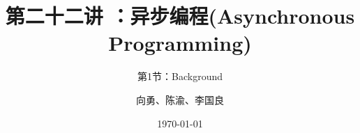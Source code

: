 


\title[第22讲]{第二十二讲 ：异步编程(Asynchronous Programming)} %
\subtitle{第1节：Background}
\author{向勇、陈渝、李国良} %
\date{\today} %



\begin{frame}
\titlepage %
\end{frame}

